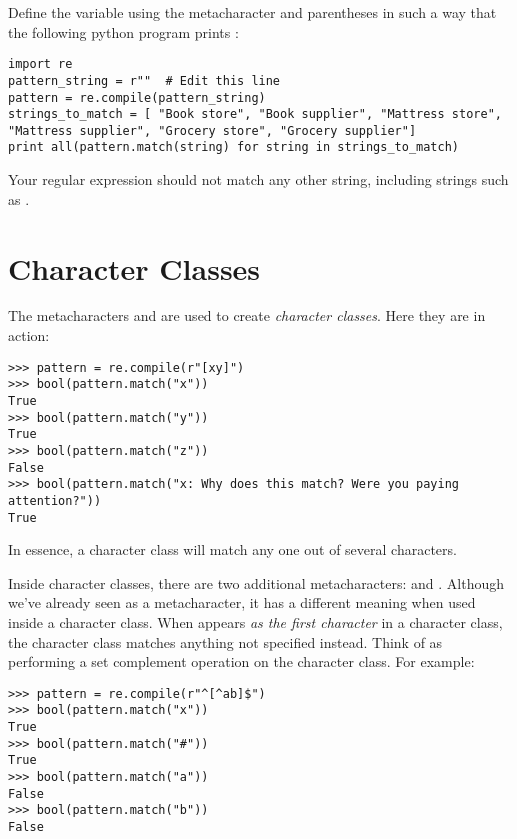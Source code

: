 %

\begin{problem}
Define the variable  using the metacharacter  and parentheses in such a way that the following python program prints :

\begin{lstlisting}
import re
pattern_string = r""  # Edit this line
pattern = re.compile(pattern_string)
strings_to_match = [ "Book store", "Book supplier", "Mattress store", "Mattress supplier", "Grocery store", "Grocery supplier"]
print all(pattern.match(string) for string in strings_to_match)
\end{lstlisting}
Your regular expression should not match any other string, including strings such as .
\end{problem}

\section*{Character Classes}
The metacharacters \li{'['} and \li{']'} are used to create \emph{character classes}.
Here they are in action:
\begin{lstlisting}
>>> pattern = re.compile(r"[xy]")
>>> bool(pattern.match("x"))
True
>>> bool(pattern.match("y"))
True
>>> bool(pattern.match("z"))
False
>>> bool(pattern.match("x: Why does this match? Were you paying attention?"))
True
\end{lstlisting}

In essence, a character class will match any one out of several characters.

Inside character classes, there are two additional metacharacters:  and .
Although we've already seen  as a metacharacter, it has a different meaning when used inside a character class.
When  appears \emph{as the first character} in a character class, the character class matches anything not specified instead.
Think of  as performing a set complement operation on the character class.
For example:
\begin{lstlisting}
>>> pattern = re.compile(r"^[^ab]$")
>>> bool(pattern.match("x"))
True
>>> bool(pattern.match("#"))
True
>>> bool(pattern.match("a"))
False
>>> bool(pattern.match("b"))
False
\end{lstlisting}

